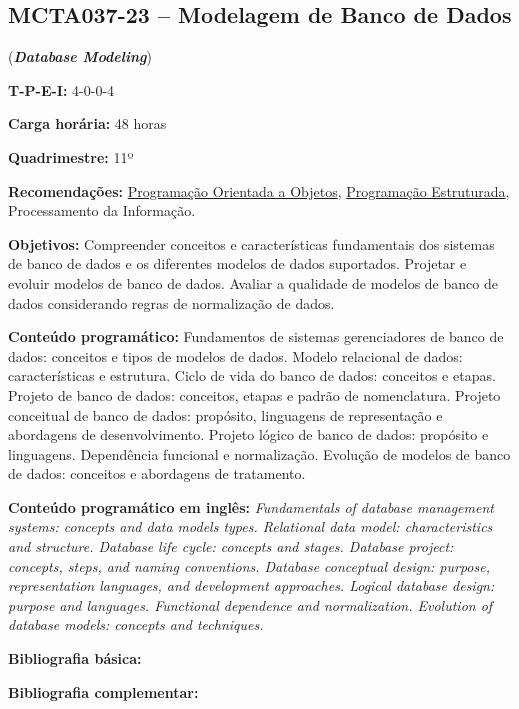 \documentclass[12pt,a4paper]{article}
\begin{document}
\subsection*{MCTA037-23 -- Modelagem de Banco de Dados}
\label{disc:mbd}

(\textbf{\textit{Database Modeling}})

\begin{center}
\begin{minipage}{0.85\textwidth}
    
    \textbf{T-P-E-I:} 4-0-0-4

    \textbf{Carga horária:} 48 horas
    
    \textbf{Quadrimestre:} 11º 
    
    \textbf{Recomendações:} 
    \hyperref[disc:poo]{Programação Orientada a Objetos},
    \hyperref[disc:pe]{Programação Estruturada},
    Processamento da Informação.
    
\end{minipage}
\end{center}

\textbf{Objetivos:}
Compreender conceitos e características fundamentais dos sistemas de banco de
dados e os diferentes modelos de dados suportados. 
Projetar e evoluir modelos de banco de dados. 
Avaliar a qualidade de modelos de banco de dados considerando regras de
normalização de dados.

\textbf{Conteúdo programático:}
Fundamentos de sistemas gerenciadores de banco de dados: conceitos e tipos de modelos de dados.
Modelo relacional de dados: características e estrutura.  
Ciclo de vida do banco de dados: conceitos e etapas. 
Projeto de banco de dados: conceitos, etapas e padrão de nomenclatura. 
Projeto conceitual de banco de dados: propósito, linguagens de representação e abordagens de desenvolvimento. 
Projeto lógico de banco de dados: propósito e linguagens. 
Dependência funcional e normalização. 
Evolução de modelos de banco de dados: conceitos e abordagens de tratamento.

\textbf{Conteúdo programático em inglês:}
\textit{Fundamentals of database management systems: concepts and data models types.
Relational data model: characteristics and structure.
Database life cycle: concepts and stages.
Database project: concepts, steps, and naming conventions.
Database conceptual design: purpose, representation languages, and development approaches.
Logical database design: purpose and languages.
Functional dependence and normalization.
Evolution of database models: concepts and techniques.}

\newrefsection
\textbf{Bibliografia básica:}
\nocite{2015-date, 2013-teory-etal, 2005-elmasri-navathe} 
\printbibliography

\newrefsection
\textbf{Bibliografia complementar:}
\nocite{2006-allen-terry, 2005-date, 2012-silberschatz-etal, 2011-coronel, 2008-halpin-morgan}
\printbibliography
\end{document}
